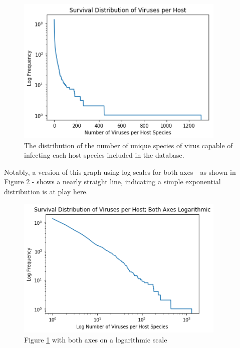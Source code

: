 \documentclass[12pt]{article}
\begin{document}
    \begin{figure}[H]
        \begin{center}
            \includegraphics[width=100mm]{viruses_per_host_figure.png}
            \caption{The distribution of the number of unique species of virus
            capable of infecting each host species included in the database.}
            \label {viruses_per_host_figure}
        \end{center}
    \end{figure}

    Notably, a version of this graph using log scales for both axes - as shown in
    Figure \ref{log_viruses_per_host_figure} - shows a nearly straight line,
    indicating a simple exponential distribution is at play here.

    \begin{figure}[H]
        \begin{center}
            \includegraphics[width=100mm]{log_viruses_per_host_figure.png}
            \caption{Figure \ref{viruses_per_host_figure} with both axes on a
            logarithmic scale}
            \label{log_viruses_per_host_figure}
        \end{center}
    \end{figure}
\end{document}
